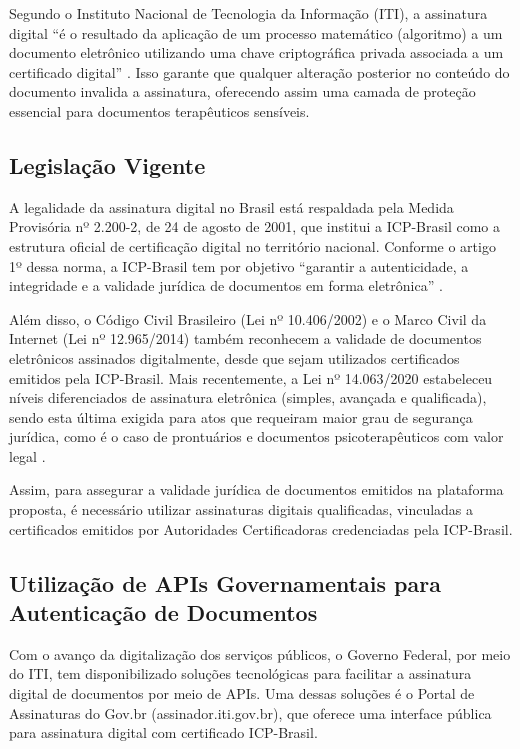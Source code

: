 Segundo o Instituto Nacional de Tecnologia da Informação (ITI), a assinatura digital “é o resultado da aplicação de um processo matemático (algoritmo) a um documento eletrônico utilizando uma chave criptográfica privada associada a um certificado digital” \cite{iti2023assinatura}. Isso garante que qualquer alteração posterior no conteúdo do documento invalida a assinatura, oferecendo assim uma camada de proteção essencial para documentos terapêuticos sensíveis.

\subsection{Legislação Vigente}

A legalidade da assinatura digital no Brasil está respaldada pela Medida Provisória nº 2.200-2, de 24 de agosto de 2001, que institui a ICP-Brasil como a estrutura oficial de certificação digital no território nacional. Conforme o artigo 1º dessa norma, a ICP-Brasil tem por objetivo “garantir a autenticidade, a integridade e a validade jurídica de documentos em forma eletrônica” \cite{brasil2001medida}.

Além disso, o Código Civil Brasileiro (Lei nº 10.406/2002) e o Marco Civil da Internet (Lei nº 12.965/2014) também reconhecem a validade de documentos eletrônicos assinados digitalmente, desde que sejam utilizados certificados emitidos pela ICP-Brasil. Mais recentemente, a Lei nº 14.063/2020 estabeleceu níveis diferenciados de assinatura eletrônica (simples, avançada e qualificada), sendo esta última exigida para atos que requeiram maior grau de segurança jurídica, como é o caso de prontuários e documentos psicoterapêuticos com valor legal \cite{brasil2020lei}.

Assim, para assegurar a validade jurídica de documentos emitidos na plataforma proposta, é necessário utilizar assinaturas digitais qualificadas, vinculadas a certificados emitidos por Autoridades Certificadoras credenciadas pela ICP-Brasil.

\subsection{Utilização de APIs Governamentais para Autenticação de Documentos}

Com o avanço da digitalização dos serviços públicos, o Governo Federal, por meio do ITI, tem disponibilizado soluções tecnológicas para facilitar a assinatura digital de documentos por meio de APIs. Uma dessas soluções é o Portal de Assinaturas do Gov.br (assinador.iti.gov.br), que oferece uma interface pública para assinatura digital com certificado ICP-Brasil.

